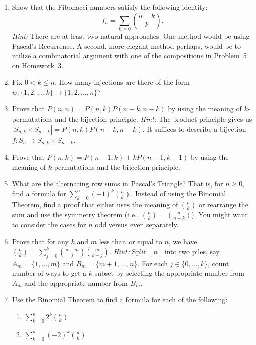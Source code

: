 \documentclass[11pt]{article}%
\theoremstyle{definition}
\begin{document}
\begin{enumerate}
\item Show that the Fibonacci numbers satisfy the following identity:
\[
f_n = \sum_{k\geq 0} \binom{n-k}{k}.
\]
\emph{Hint:} There are at least two natural approaches.  One method would be using Pascal's Recurrence.  A second, more elegant method perhaps, would be to utilize a combinatorial argument with one of the compositions in Problem~5 on Homework~3.
\item  Fix $0<k\leq n$. How many injections are there of the form $w: \{1,2,\ldots,k\}\to \{1,2,\ldots,n\}$?
\item Prove that $P(n,n) = P(n,k)P(n-k,n-k)$ by using the meaning of $k$-permutations and the bijection principle. \emph{Hint:} The product principle gives us $|S_{n,k}\times S_{n-k}|=P(n,k)P(n-k,n-k)$. It suffices to describe a bijection
$f: S_n \to S_{n,k} \times S_{n-k}$.
\item Prove that $P(n,k)=P(n-1,k)+kP(n-1,k-1)$ by using the meaning of $k$-permutations and the bijection principle.
\item What are the alternating row sums in Pascal's Triangle?  That is, for $n\geq 0$, find a formula for $\sum_{k=0}^{n}(-1)^k\binom{n}{k}$. Instead of using the Binomial Theorem, find a proof that either uses the meaning of $\binom{n}{k}$ or rearrange the sum and use the symmetry theorem (i.e., $\binom{n}{k}=\binom{n}{n-k}$). You might want to consider the cases for $n$ odd versus even separately.
\item Prove that for any $k$ and $m$ less than or equal to $n$, we have $\binom{n}{k}=\sum_{j=0}^k\binom{n-m}{j}\binom{m}{k-j}$. \textit{Hint:} Split $[n]$ into two piles, say $A_m=\{1,\ldots,m\}$ and $B_m=\{m+1,\ldots,n\}$. For each $j\in\{0,\ldots, k\}$, count number of ways to get a $k$-subset by selecting the appropriate number from $A_m$ and the appropriate number from $B_m$.
\item Use the Binomial Theorem to find a formula for each of the following:
\begin{enumerate}
\item $\displaystyle \sum_{k=0}^n2^k\binom{n}{k}$
\item $\displaystyle \sum_{k=0}^n(-2)^k\binom{n}{k}$
\end{enumerate}
\end{enumerate}
\end{document}
